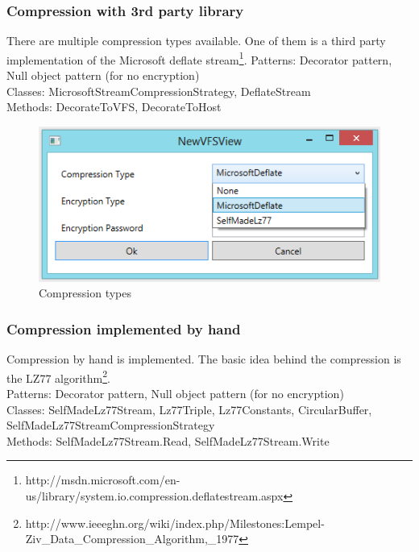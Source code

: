\documentclass[JCDReport.tex]{subfiles}
\begin{document}
\subsubsection{Compression with 3rd party library}
There are multiple compression types available. One of them is a third party implementation of the Microsoft deflate stream\footnote{http://msdn.microsoft.com/en-us/library/system.io.compression.deflatestream.aspx}.
Patterns: Decorator pattern, Null object pattern (for no encryption)\\
Classes: MicrosoftStreamCompressionStrategy, DeflateStream\\
Methods: DecorateToVFS, DecorateToHost\\
\begin{figure}[h!]
	\centering
	\includegraphics[scale=1]{Images/compression_types.png} 
	\caption{Compression types}
\end{figure}

\subsubsection{Compression implemented by hand}
Compression by hand is implemented. The basic idea behind the compression is the LZ77 algorithm\footnote{http://www.ieeeghn.org/wiki/index.php/Milestones:Lempel-Ziv\_Data\_Compression\_Algorithm,\_1977}.\\
Patterns: Decorator pattern, Null object pattern (for no encryption)\\
Classes: SelfMadeLz77Stream, Lz77Triple, Lz77Constants, CircularBuffer, SelfMadeLz77StreamCompressionStrategy\\
Methods: SelfMadeLz77Stream.Read, SelfMadeLz77Stream.Write

\end{document}
